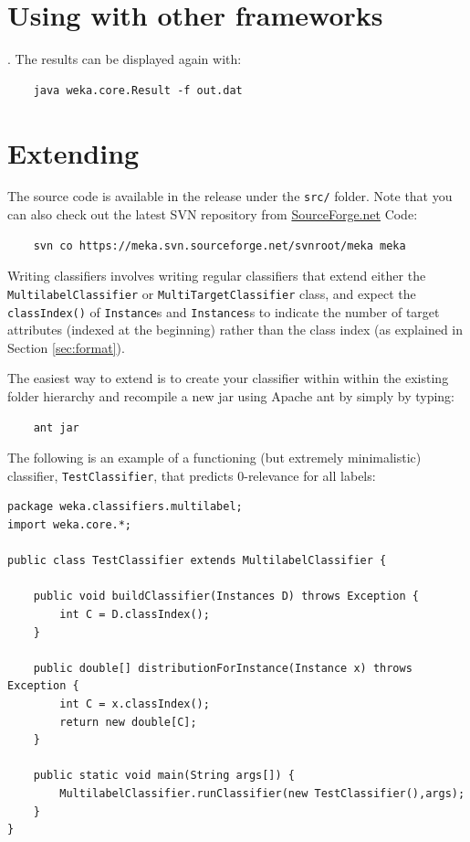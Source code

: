 \documentclass[11pt]{article}
\newcommand{\MEKA}{Meka}
\newcommand{\WEKA}{Weka}
\begin{document}

\section{Using \framework{\MEKA} with other frameworks} \label{sec:others}

. The results can be displayed again with:
\begin{verbatim}
	java weka.core.Result -f out.dat 
\end{verbatim}



\section{\label{sec:extending}Extending \framework{\MEKA}}%

The source code is available in the release under the \texttt{src/} folder. Note that you can also check out the latest SVN repository from \url{SourceForge.net} \textsf{Code}: 
\begin{verbatim}
	svn co https://meka.svn.sourceforge.net/svnroot/meka meka 
\end{verbatim}

Writing \framework{\MEKA} classifiers involves writing regular \framework{\WEKA} classifiers that extend either the \texttt{MultilabelClassifier} or \texttt{MultiTargetClassifier} class, and expect the \texttt{classIndex()} of \texttt{Instance}s and \texttt{Instances}s to indicate the number of target attributes (indexed at the beginning) rather than the class index (as explained in Section \ref{sec:format}). 

The easiest way to extend \framework{\MEKA} is to create your classifier within within the existing \framework{\MEKA} folder hierarchy and recompile a new jar using Apache ant by simply by typing:
\begin{verbatim}
	ant jar
\end{verbatim}

The following is an example of a functioning (but extremely minimalistic) classifier, \texttt{TestClassifier}, that predicts $0$-relevance for all labels:

{\small
\begin{verbatim}
package weka.classifiers.multilabel;
import weka.core.*;

public class TestClassifier extends MultilabelClassifier {
	
    public void buildClassifier(Instances D) throws Exception {
        int C = D.classIndex();
    }
    
    public double[] distributionForInstance(Instance x) throws Exception {
        int C = x.classIndex();
       	return new double[C];
    }
    
    public static void main(String args[]) {
        MultilabelClassifier.runClassifier(new TestClassifier(),args);
    }
}
\end{verbatim}
}
\end{document}
